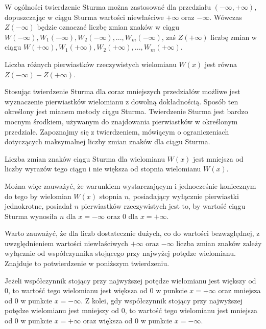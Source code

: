 W ogólności twierdzenie Sturma można zastosować dla przedziału $(-\infty,+\infty)$, dopuszczając w ciągu Sturma wartości niewłaściwe $+\infty$ oraz $-\infty$. Wówczas $Z(-\infty)$ będzie oznaczać liczbę zmian znaków w ciągu $W(-\infty), W_1(-\infty), W_2(-\infty),..., W_m(-\infty)$, zaś $Z(+\infty)$ liczbę zmian w ciągu $W(+\infty), W_1(+\infty), W_2(+\infty),..., W_m(+\infty)$.

\begin{theorem}
	$ $ \\
	Liczba różnych pierwiastków rzeczywistych wielomianu $W(x)$ jest równa $Z(-\infty)-Z(+\infty)$.
\end{theorem}

Stosując twierdzenie Sturma dla coraz mniejszych przedziałów możliwe jest wyznaczenie pierwiastków wielomianu z dowolną dokładnością. Sposób ten określony jest mianem metody ciągu Sturma.
Twierdzenie Sturma jest bardzo mocnym środkiem, używanym do znajdowania pierwiastków w określonym przedziale. Zapoznajmy się z twierdzeniem, mówiącym o ograniczeniach dotyczących maksymalnej liczby zmian znaków dla ciągu Sturma.

\begin{theorem}
	$ $ \\
	Liczba zmian znaków ciągu Sturma dla wielomianu $W(x)$ jest mniejsza od liczby wyrazów tego ciągu i nie większa od stopnia wielomianu $W(x)$.
\end{theorem}

Można więc zauważyć, że warunkiem wystarczającym i jednocześnie koniecznym do tego by wielomian $W(x)$ stopnia $n$, posiadający wyłącznie pierwiastki jednokrotne, posiadał $n$ pierwiastków rzeczywistych jest to, by wartość ciągu Sturma wynosiła $n$ dla $x=-\infty$ oraz $0$ dla $x=+\infty$. 

Warto zauważyć, że dla liczb dostatecznie dużych, co do wartości bezwzględnej, z uwzględnieniem wartości niewłaściwych $+\infty$ oraz $-\infty$ liczba zmian znaków zależy wyłącznie od współczynnika stojącego przy najwyżej potędze wielomianu. Znajduje to potwierdzenie w poniższym twierdzeniu.

\begin{theorem}
	$ $ \\
	Jeżeli współczynnik stojący przy najwyższej potędze wielomianu jest większy od $0$, to wartość tego wielomianu jest większa od $0$ w punkcie $x=+\infty$ oraz mniejsza od $0$ w punkcie $x=-\infty$.
	Z kolei, gdy współczynnik stojący przy najwyższej potędze wielomianu jest mniejszy od $0$, to wartość tego wielomianu jest mniejsza od $0$ w punkcie $x=+\infty$ oraz większa od $0$ w punkcie $x=-\infty$.
\end{theorem}

